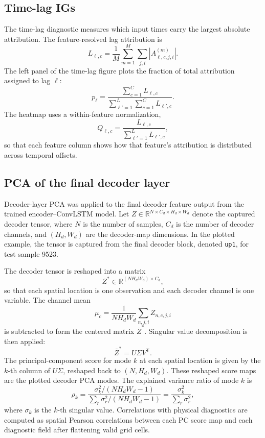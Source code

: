 \subsection{Time-lag IGs}
\label{app:time-lag-igs}

The time-lag diagnostic measures which input times carry the largest absolute attribution. The feature-resolved lag attribution is
\[
L_{\ell,c}
=
\frac{1}{M}\sum_{m=1}^{M}\sum_{j,i}
\left|A^{(m)}_{\ell,c,j,i}\right| .
\]
The left panel of the time-lag figure plots the fraction of total attribution assigned to lag \(\ell\):
\[
p_{\ell}
=
\frac{\sum_{c=1}^{C}L_{\ell,c}}
{\sum_{\ell'=1}^{L}\sum_{c=1}^{C}L_{\ell',c}} .
\]
The heatmap uses a within-feature normalization,
\[
Q_{\ell,c}
=
\frac{L_{\ell,c}}
{\sum_{\ell'=1}^{L}L_{\ell',c}},
\]
so that each feature column shows how that feature's attribution is distributed across temporal offsets.

\subsection{PCA of the final decoder layer}
\label{app:decoder-pca}

Decoder-layer PCA was applied to the final decoder feature output from the trained encoder--ConvLSTM model. Let \(Z\in\mathbb{R}^{N\times C_d\times H_d\times W_d}\) denote the captured decoder tensor, where \(N\) is the number of samples, \(C_d\) is the number of decoder channels, and \((H_d,W_d)\) are the decoder-map dimensions. In the plotted example, the tensor is captured from the final decoder block, denoted \texttt{up1}, for test sample 9523.

The decoder tensor is reshaped into a matrix
\[
Z^{\ast}\in\mathbb{R}^{(N H_d W_d)\times C_d},
\]
so that each spatial location is one observation and each decoder channel is one variable. The channel mean
\[
\mu_c=\frac{1}{N H_d W_d}\sum_{n,j,i} Z_{n,c,j,i}
\]
is subtracted to form the centered matrix \(\bar{Z}^{\ast}\). Singular value decomposition is then applied:
\[
\bar{Z}^{\ast}=U\Sigma V^{\mathsf{T}}.
\]
The principal-component score for mode \(k\) at each spatial location is given by the \(k\)-th column of \(U\Sigma\), reshaped back to \((N,H_d,W_d)\). These reshaped score maps are the plotted decoder PCA modes. The explained variance ratio of mode \(k\) is
\[
\rho_k
=
\frac{\sigma_k^2/(N H_d W_d-1)}
{\sum_{r}\sigma_r^2/(N H_d W_d-1)}
=
\frac{\sigma_k^2}{\sum_{r}\sigma_r^2},
\]
where \(\sigma_k\) is the \(k\)-th singular value. Correlations with physical diagnostics are computed as spatial Pearson correlations between each PC score map and each diagnostic field after flattening valid grid cells.
